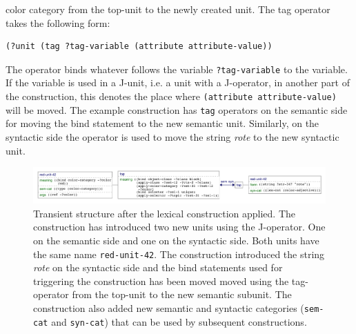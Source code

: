 \begin{description}
color category from the top-unit to the newly created unit.
The tag operator takes the following form:
\begin{lstlisting}
(?unit (tag ?tag-variable (attribute attribute-value))
\end{lstlisting}
The operator binds whatever follows the variable {\footnotesize\tt ?tag-variable}
to the variable. If the variable is used in a J-unit, i.e. a unit with a J-operator, 
in another part of the construction, this denotes the place where 
{\footnotesize\tt (attribute attribute-value)} will be moved. The example
construction has {\footnotesize\tt tag} operators on the semantic side for moving the
bind statement to the new semantic unit. Similarly, on the syntactic side the
operator is used to move the string \textit{rote} to the new syntactic unit.
\end{description}

\begin{figure}
\begin{center}
\includegraphics[width=\textwidth]{figs/simple-grammar-after-red-application}
\end{center}
\caption[Transient structure after lexical constructions applied]{%
Transient structure after the lexical construction applied. The construction
has introduced two new units using the J-operator. 
One on the semantic side and one on the syntactic side.
Both units have the same name {\footnotesize\tt red-unit-42}. The construction introduced
the string \textit{rote} on the syntactic side and the bind statements used for 
triggering the construction has been moved moved using the tag-operator 
from the top-unit to the new semantic subunit.
The construction also added new semantic and syntactic categories
({\footnotesize\tt sem-cat} and {\footnotesize\tt syn-cat}) that can be used by 
subsequent constructions.}
\label{f:after-red-cxn}
\end{figure}

